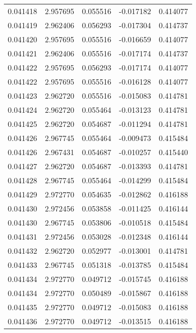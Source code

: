 \begin{tabular}{lrrrr}
0.041418    &  2.957695 &  0.055516 & -0.017182 &             0.414077 \\
0.041419    &  2.962406 &  0.056293 & -0.017304 &             0.414737 \\
0.041420    &  2.957695 &  0.055516 & -0.016659 &             0.414077 \\
0.041421    &  2.962406 &  0.055516 & -0.017174 &             0.414737 \\
0.041422    &  2.957695 &  0.056293 & -0.017174 &             0.414077 \\
0.041422    &  2.957695 &  0.055516 & -0.016128 &             0.414077 \\
0.041423    &  2.962720 &  0.055516 & -0.015083 &             0.414781 \\
0.041424    &  2.962720 &  0.055464 & -0.013123 &             0.414781 \\
0.041425    &  2.962720 &  0.054687 & -0.011294 &             0.414781 \\
0.041426    &  2.967745 &  0.055464 & -0.009473 &             0.415484 \\
0.041426    &  2.967431 &  0.054687 & -0.010257 &             0.415440 \\
0.041427    &  2.962720 &  0.054687 & -0.013393 &             0.414781 \\
0.041428    &  2.967745 &  0.055464 & -0.014299 &             0.415484 \\
0.041429    &  2.972770 &  0.054635 & -0.012862 &             0.416188 \\
0.041430    &  2.972456 &  0.053858 & -0.011425 &             0.416144 \\
0.041430    &  2.967745 &  0.053806 & -0.010518 &             0.415484 \\
0.041431    &  2.972456 &  0.053028 & -0.012348 &             0.416144 \\
0.041432    &  2.962720 &  0.052977 & -0.013001 &             0.414781 \\
0.041433    &  2.967745 &  0.051318 & -0.013785 &             0.415484 \\
0.041434    &  2.972770 &  0.049712 & -0.015745 &             0.416188 \\
0.041434    &  2.972770 &  0.050489 & -0.015867 &             0.416188 \\
0.041435    &  2.972770 &  0.049712 & -0.015083 &             0.416188 \\
0.041436    &  2.972770 &  0.049712 & -0.013515 &             0.416188 \\

\end{tabular}
